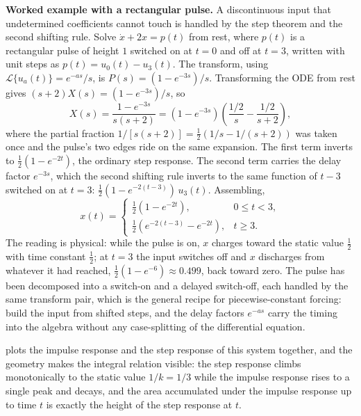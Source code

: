 \textbf{Worked example with a rectangular pulse.} A discontinuous input
that undetermined coefficients cannot touch is handled by the step
theorem and the second shifting rule. Solve $\dot{x} + 2x = p(t)$ from
rest, where $p(t)$ is a rectangular pulse of height $1$ switched on at
$t = 0$ and off at $t = 3$, written with unit steps as $p(t) = u_{0}(t)
- u_{3}(t)$. The transform, using $\mathcal{L}\{u_{a}(t)\} = e^{-as}/s$,
is $P(s) = (1 - e^{-3s})/s$. Transforming the ODE from rest gives
$(s + 2)X(s) = (1 - e^{-3s})/s$, so
\[
X(s) = \frac{1 - e^{-3s}}{s(s + 2)}
= (1 - e^{-3s})\left(\frac{1/2}{s} - \frac{1/2}{s + 2}\right),
\]
where the partial fraction $1/[s(s+2)] = \tfrac12(1/s - 1/(s+2))$ was
taken once and the pulse's two edges ride on the same expansion. The
first term inverts to $\tfrac12(1 - e^{-2t})$, the ordinary
step response. The second term carries the delay factor $e^{-3s}$,
which the second shifting rule inverts to the same function of $t - 3$
switched on at $t = 3$: $\tfrac12(1 - e^{-2(t-3)})\, u_{3}(t)$.
Assembling,
\[
x(t) = \begin{cases}
\tfrac12(1 - e^{-2t}), & 0 \leq t < 3, \\[2pt]
\tfrac12(e^{-2(t-3)} - e^{-2t}), & t \geq 3.
\end{cases}
\]
The reading is physical: while the pulse is on, $x$ charges toward the
static value $\tfrac12$ with time constant $\tfrac12$; at $t = 3$ the
input switches off and $x$ discharges from whatever it had reached,
$\tfrac12(1 - e^{-6}) \approx 0.499$, back toward zero. The pulse has
been decomposed into a switch-on and a delayed switch-off, each handled
by the same transform pair, which is the general recipe for
piecewise-constant forcing: build the input from shifted steps, and the
delay factors $e^{-as}$ carry the timing into the algebra without any
case-splitting of the differential equation.

 plots the impulse response and the
step response of this system together, and the geometry makes the
integral relation visible: the step response climbs monotonically to the
static value $1/k = 1/3$ while the impulse response rises to a single
peak and decays, and the area accumulated under the impulse response up
to time $t$ is exactly the height of the step response at $t$.



